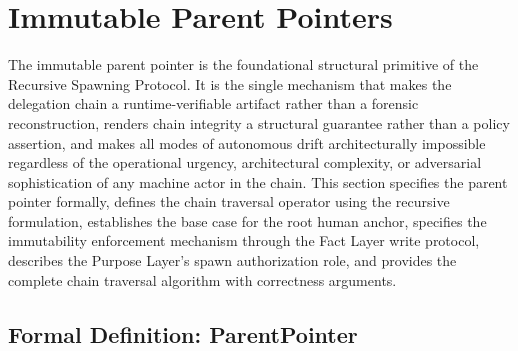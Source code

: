 \section{Immutable Parent Pointers}
\label{sec:immutable-parent-pointers}

The immutable parent pointer is the foundational structural primitive of the Recursive Spawning Protocol. It is the single mechanism that makes the delegation chain a runtime-verifiable artifact rather than a forensic reconstruction, renders chain integrity a structural guarantee rather than a policy assertion, and makes all modes of autonomous drift architecturally impossible regardless of the operational urgency, architectural complexity, or adversarial sophistication of any machine actor in the chain. This section specifies the parent pointer formally, defines the chain traversal operator using the recursive formulation, establishes the base case for the root human anchor, specifies the immutability enforcement mechanism through the Fact Layer write protocol, describes the Purpose Layer's spawn authorization role, and provides the complete chain traversal algorithm with correctness arguments.

\subsection{Formal Definition: ParentPointer}
\label{sec:parent-pointer-definition}

